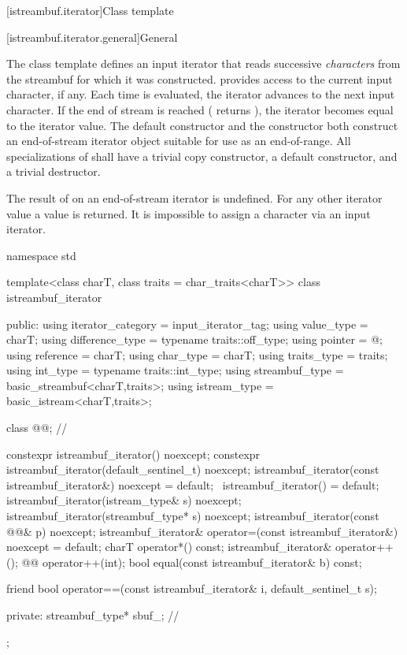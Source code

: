 [istreambuf.iterator]{Class template }

[istreambuf.iterator.general]{General}

\pnum
The
class template
defines an input iterator that
reads successive
\textit{characters}
from the streambuf for which it was constructed.
provides access to the current input character, if any.
Each time
is evaluated, the iterator advances to the next input character.
If the end of stream is reached ( returns
),
the iterator becomes equal to the
iterator value.
The default constructor
and the constructor
both construct an end-of-stream iterator object suitable for use
as an end-of-range.
All specializations of  shall have a trivial copy
constructor, a  default constructor, and a trivial destructor.

\pnum
The result of
on an end-of-stream iterator is undefined.
%
For any other iterator value a
value is returned.
It is impossible to assign a character via an input iterator.

%
\begin{codeblock}
namespace std {
  template<class charT, class traits = char_traits<charT>>
  class istreambuf_iterator {
  public:
    using iterator_category = input_iterator_tag;
    using value_type        = charT;
    using difference_type   = typename traits::off_type;
    using pointer           = @\unspec@;
    using reference         = charT;
    using char_type         = charT;
    using traits_type       = traits;
    using int_type          = typename traits::int_type;
    using streambuf_type    = basic_streambuf<charT,traits>;
    using istream_type      = basic_istream<charT,traits>;

    class @@;                          // \expos

    constexpr istreambuf_iterator() noexcept;
    constexpr istreambuf_iterator(default_sentinel_t) noexcept;
    istreambuf_iterator(const istreambuf_iterator&) noexcept = default;
    ~istreambuf_iterator() = default;
    istreambuf_iterator(istream_type& s) noexcept;
    istreambuf_iterator(streambuf_type* s) noexcept;
    istreambuf_iterator(const @@& p) noexcept;
    istreambuf_iterator& operator=(const istreambuf_iterator&) noexcept = default;
    charT operator*() const;
    istreambuf_iterator& operator++();
    @@ operator++(int);
    bool equal(const istreambuf_iterator& b) const;

    friend bool operator==(const istreambuf_iterator& i, default_sentinel_t s);

  private:
    streambuf_type* sbuf_;              // \expos
  };
}
\end{codeblock}


